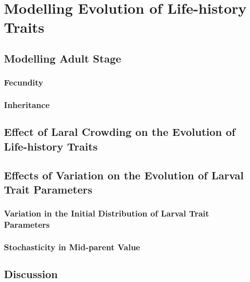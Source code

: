 \chapter{Modelling Evolution of Life-history Traits}

\section{Modelling Adult Stage}

\subsection{Fecundity}

\subsection{Inheritance}

\section{Effect of Laral Crowding on the Evolution of Life-history Traits}

\section{Effects of Variation on the Evolution of Larval Trait Parameters}

\subsection{Variation in the Initial Distribution of Larval Trait Parameters}

\subsection{Stochasticity in Mid-parent Value}

\section{Discussion}

\pagebreak
\renewcommand\bibname{{References}}


